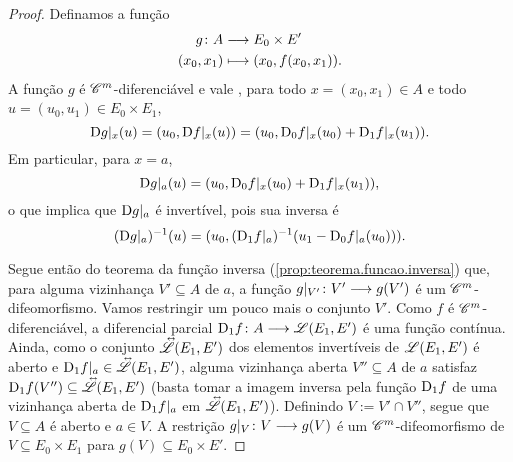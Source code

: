 \begin{proof}
Definamos a função
	\begin{align*}
	{g}\colon {A} &\longrightarrow {E_0 \times E'} \\{(x_0,x_1)} &\longmapsto (x_0, f(x_0,x_1)).
	\end{align*}
A função $g$ é $\mathscr{C}^m$-diferenciável e vale%
, para todo $x = (x_0,x_1) \in A$ e todo $u = (u_0,u_1) \in E_0 \times E_1$,
	\begin{equation*}
	\mathrm{D} g|_x(u) = (u_0, \mathrm{D} f|_x(u)) = (u_0, \mathrm{D}_0 f|_x(u_0) + \mathrm{D}_1 f|_x(u_1)).
	\end{equation*}
Em particular, para $x=a$,
	\begin{equation*}
	\mathrm{D} g|_a(u) = (u_0, \mathrm{D}_0 f|_x(u_0) + \mathrm{D}_1 f|_x(u_1)),
	\end{equation*}
o que implica que $\mathrm{D} g|_a$ é invertível, pois sua inversa é
	\begin{equation*}
	(\mathrm{D} g|_a)^{-1}(u) = (u_0, (\mathrm{D}_1 f|_a)^{-1} (u_1 - \mathrm{D}_0 f|_a(u_0))).
	\end{equation*}

Segue então do teorema da função inversa (\ref{prop:teorema.funcao.inversa}) que, para alguma vizinhança $V' \subseteq A$ de $a$, a função $g|_{V'}\colon \allowbreak V' \longrightarrow g(V')$ é um $\mathscr{C}^m$-difeomorfismo. Vamos restringir um pouco mais o conjunto $V'$. Como $f$ é $\mathscr{C}^m$-diferenciável, a diferencial parcial $\mathrm{D}_1 f\colon \allowbreak A \longrightarrow \mathscr{L}(E_1, E')$ é uma função contínua. Ainda, como o conjunto $\accentset{\leftrightarrow}{\mathscr{L}}(E_1, E')$ dos elementos invertíveis de $\mathscr{L}(E_1, E')$ é aberto e $\mathrm{D}_1 f|_a \in \accentset{\leftrightarrow}{\mathscr{L}}(E_1, E')$, alguma vizinhança aberta $V'' \subseteq A$ de $a$ satisfaz $\mathrm{D}_1 f(V'') \subseteq \accentset{\leftrightarrow}{\mathscr{L}}(E_1, E')$ (basta tomar a imagem inversa pela função $\mathrm{D}_1 f$ de uma vizinhança aberta de $\mathrm{D}_1 f|_a$ em $\accentset{\leftrightarrow}{\mathscr{L}}(E_1, E')$). Definindo $V := V' \cap V''$, segue que $V \subseteq A$ é aberto e $a \in V$. A restrição $g|_V\colon \allowbreak V \longrightarrow g(V)$ é um $\mathscr{C}^m$-difeomorfismo de $V \subseteq E_0 \times E_1$ para $g(V) \subseteq E_0 \times E'$.


\end{proof}
